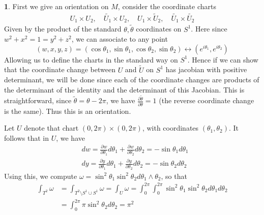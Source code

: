 \documentclass[10.5pt]{article}
\theoremstyle{definition}
\newtheorem{pb}{}
\begin{document}
    \begin{pb}
        First we give an orientation on \(M\), consider the coordinate charts
        \begin{align*}
            U_1 \times U_2, \quad \tilde{U_1} \times U_2, \quad U_1 \times \tilde U_2, \quad
            \tilde{U_1} \times \tilde{U_2}
        \end{align*}
        Given by the product of the standard \(\theta,\tilde{\theta}\) coordinates on \(S^1\). Here since \(w^2 + x^2 = 1 = y^2 + z^2\), we can associate to any point
        \[(w,x,y,z) = (\cos\theta_1,\sin\theta_1,\cos\theta_2,\sin\theta_2) \longleftrightarrow (e^{i\theta_1},e^{i\theta_2})\]
        Allowing us to define the charts in the standard way on \(S^1\). Hence if we can show that the coordinate change between \(U\) and \(\tilde{U}\) on \(S^1\) has jacobian with positive determinant, we will be done since each of the coordinate changes are products of the determinant of the identity and the determinant of this Jacobian. This is straightforward, since \(\tilde{\theta} = \theta - 2\pi\), we have \(\frac{\partial \tilde{\theta}}{\partial \theta} = 1\) (the reverse coordinate change is the same). Thus this is an orientation.

        Let \(U\) denote that chart
        \((0,2\pi)\times(0,2\pi)\), with coordinates \((\theta_1,\theta_2)\).
        It follows that in \(U\), we have 
        \begin{align*}
            &dw = \frac{\partial w}{\partial \theta_1} d\theta_1 + \frac{\partial w}{\partial \theta_2} d\theta_2 = -\sin\theta_1 d\theta_1\\
            &dy = \frac{\partial y}{\partial \theta_1}d\theta_1 + \frac{\partial y}{\partial \theta_2}d\theta_2 = -\sin\theta_2 d\theta_2
        \end{align*}
        Using this, we compute
        \(\omega = \sin^2\theta_1\sin^2\theta_2 d\theta_1 \wedge \theta_2\), so that
        \begin{align*}
            \int_{T^2} \omega &= \int_{T^2 \setminus S^1 \cup S^1} \omega = \int_U \omega
            = \int_0^{2\pi}\int_0^{2\pi}\sin^2\theta_1\sin^2\theta_2 d\theta_1d\theta_2 \\
            &= \int_0^{2\pi}\pi\sin^2\theta_2d\theta_2 = \pi^2
        \end{align*}
    \end{pb}
\end{document}
